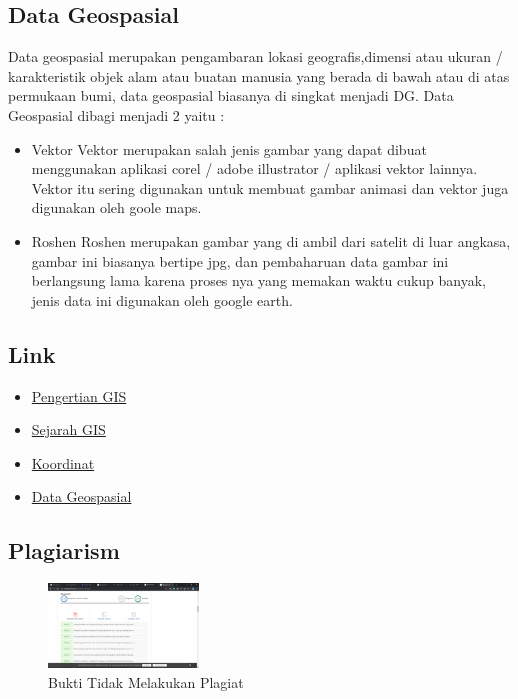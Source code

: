 \subsection{Data Geospasial}
Data geospasial merupakan pengambaran lokasi geografis,dimensi atau ukuran / karakteristik objek alam atau buatan manusia yang berada di bawah atau di atas permukaan bumi, data geospasial biasanya di singkat menjadi DG.
\hfill\break
Data Geospasial dibagi menjadi 2 yaitu :
\begin{itemize}
	\item Vektor
	Vektor merupakan salah jenis gambar yang dapat dibuat menggunakan aplikasi corel / adobe illustrator / aplikasi vektor lainnya. \hfill\break 
	Vektor itu sering digunakan untuk membuat gambar animasi dan vektor juga digunakan oleh goole maps.
	\item Roshen
	Roshen merupakan gambar yang di ambil dari satelit di luar angkasa, gambar ini biasanya bertipe jpg, dan pembaharuan data gambar ini berlangsung lama karena proses nya yang memakan waktu cukup banyak, jenis data ini digunakan oleh google earth.
\end{itemize}
\subsection{Link}
\begin{itemize}
	\item \href{https://youtu.be/mhk9PhmNLvk}{Pengertian GIS}
	\item \href{https://youtu.be/7K0x-oQncy4}{Sejarah GIS}
	\item \href{https://youtu.be/QE8uvqNqbo4}{Koordinat}
	\item \href{https://youtu.be/CXYenLiAS8U}{Data Geospasial}
\end{itemize}
\subsection{Plagiarism}
\begin{figure}[H]
	\includegraphics[width=4cm]{figures/1174027/1_1174027_placek.png}
	\centering
	\caption{Bukti Tidak Melakukan Plagiat}
\end{figure}